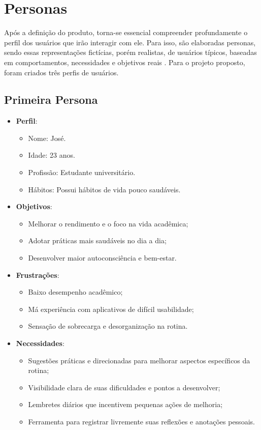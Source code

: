 \section{Personas}

Após a definição do produto, torna-se essencial compreender profundamente o perfil dos usuários que irão interagir com ele. Para isso, são elaboradas personas, sendo essas representações fictícias, porém realistas, de usuários típicos, baseadas em comportamentos, necessidades e objetivos reais \cite{caroli2017lean}. Para o projeto proposto, foram criados três perfis de usuários.

\subsection{Primeira Persona}

\begin{itemize}
    \item \textbf{Perfil}:
    \begin{itemize}
        \item Nome: José.
        \item Idade: 23 anos.
        \item Profissão: Estudante universitário.
        \item Hábitos: Possui hábitos de vida pouco saudáveis.
    \end{itemize}


    \item \textbf{Objetivos}:
    \begin{itemize}
        \item Melhorar o rendimento e o foco na vida acadêmica;
        \item Adotar práticas mais saudáveis no dia a dia;
        \item Desenvolver maior autoconsciência e bem-estar.
    \end{itemize}

    \item \textbf{Frustrações}:
    \begin{itemize}
        \item Baixo desempenho acadêmico;
        \item Má experiência com aplicativos de difícil usabilidade;
        \item Sensação de sobrecarga e desorganização na rotina.
    \end{itemize}

    \item \textbf{Necessidades}:
    \begin{itemize}
        \item Sugestões práticas e direcionadas para melhorar aspectos específicos da rotina;
        \item Visibilidade clara de suas dificuldades e pontos a desenvolver;
        \item Lembretes diários que incentivem pequenas ações de melhoria;
        \item Ferramenta para registrar livremente suas reflexões e anotações pessoais.
    \end{itemize}
\end{itemize}


